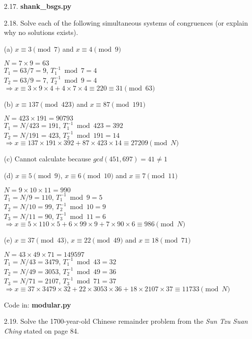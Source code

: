 2.17. \textbf{shank\_bsgs.py}

2.18. Solve each of the following simultaneous systems of congruences (or explain why no solutions exists).

(a) $x \equiv 3 \pmod 7$ and $x \equiv 4 \pmod 9$
    
    $N=7 \times 9=63$ \\ $T_1=63/7=9$, $T_1^{-1} \bmod 7 = 4$ \\ $T_2=63/9=7$, $T_2^{-1} \bmod 9 = 4$ \\ $\Rightarrow x \equiv 3 \times 9 \times 4 + 4 \times 7 \times 4 \equiv 220 \equiv 31 \pmod {63}$
    
(b) $x \equiv 137 \pmod {423}$ and $x \equiv 87 \pmod {191}$
    
    $N=423 \times 191=90793$ \\ $T_1=N/423=191$, $T_1^{-1} \bmod 423 = 392$ \\ $T_2=N/191=423$, $T_2^{-1} \bmod 191 = 14$ \\ $\Rightarrow x \equiv 137 \times 191 \times 392 + 87 \times 423 \times 14 \equiv 27209 \pmod N$
    
(c) Cannot calculate because $gcd(451, 697)=41 \neq 1$
    
(d) $x \equiv 5 \pmod 9$, $x \equiv 6 \pmod {10}$ and $x \equiv 7 \pmod {11}$
    
    $N=9 \times 10 \times 11 = 990$ \\ $T_1=N/9=110$, $T_1^{-1} \bmod 9 = 5$ \\ $T_2=N/10=99$, $T_2^{-1} \bmod 10=9$ \\ $T_3=N/11=90$, $T_3^{-1} \bmod 11 = 6$ \\ $\Rightarrow x \equiv 5 \times 110 \times 5 + 6 \times 99 \times 9 + 7 \times 90 \times 6 \equiv 986 \pmod N$
    
(e) $x \equiv 37 \pmod {43}$, $x \equiv 22 \pmod {49}$ and $x \equiv 18 \pmod {71}$
    
    $N=43 \times 49 \times 71=149597$ \\ $T_1=N/43=3479$, $T_1^{-1} \bmod 43 = 32$ \\ $T_2=N/49=3053$, $T_2^{-1} \bmod 49=36$ \\ $T_3=N/71=2107$, $T_3^{-1} \bmod 71 = 37$ \\ $\Rightarrow x \equiv 37 \times 3479 \times 32 + 22 \times 3053 \times 36 + 18  \times 2107 \times 37 \equiv 11733 \pmod N$

Code in: \textbf{modular.py}

2.19. Solve the 1700-year-old Chinese remainder problem from the \textit{Sun Tzu Suan Ching} stated on page 84.

